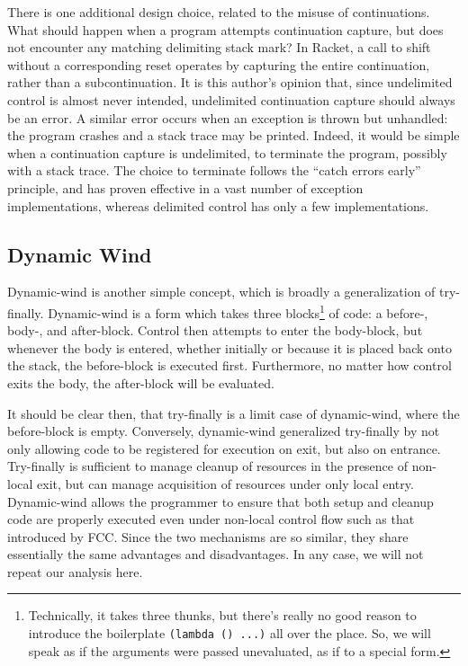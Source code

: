 \documentclass[11pt]{article}
\newcommand{\maybePage}{\newpage}
\begin{document}
There is one additional design choice, related to the misuse of continuations.
What should happen when a program attempts continuation capture, but does not encounter any matching delimiting stack mark?
In Racket, a call to shift without a corresponding reset operates by capturing the entire continuation, rather than a subcontinuation.
It is this author's opinion that, since undelimited control is almost never intended, undelimited continuation capture should always be an error.
A similar error occurs when an exception is thrown but unhandled: the program crashes and a stack trace may be printed.
Indeed, it would be simple when a continuation capture is undelimited, to terminate the program, possibly with a stack trace.
The choice to terminate follows the ``catch errors early'' principle, and  has proven effective in a vast number of exception implementations, whereas delimited control has only a few implementations.

\maybePage
\subsection{Dynamic Wind}
\label{dynamic-wind}

Dynamic-wind is another simple concept, which is broadly a generalization of try-finally.
Dynamic-wind is a form which takes three blocks\footnote{Technically, it takes three thunks, but there's really no good reason to introduce the boilerplate \texttt{(lambda () ...)} all over the place. So, we will speak as if the arguments were passed unevaluated, as if to a special form.} of code: a before-, body-, and after-block.
Control then attempts to enter the body-block, but whenever the body is entered, whether initially or because it is placed back onto the stack, the before-block is executed first.
Furthermore, no matter how control exits the body, the after-block will be evaluated.


It should be clear then, that try-finally is a limit case of dynamic-wind, where the before-block is empty.
Conversely, dynamic-wind generalized try-finally by not only allowing code to be registered for execution on exit, but also on entrance.
Try-finally is sufficient to manage cleanup of resources in the presence of non-local exit, but can manage acquisition of resources under only local entry.
Dynamic-wind allows the programmer to ensure that both setup and cleanup code are properly executed even under non-local control flow such as that introduced by FCC.
Since the two mechanisms are so similar, they share essentially the same advantages and disadvantages.
In any case, we will not repeat our analysis here.
\end{document}
